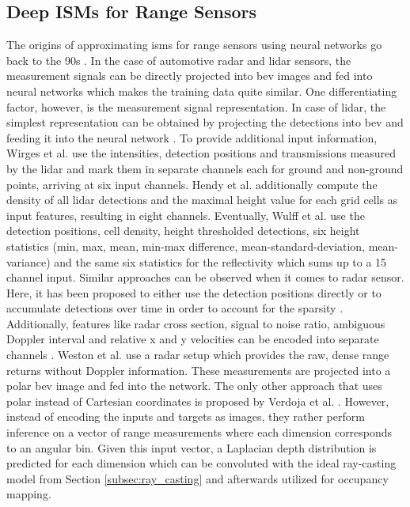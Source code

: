 \subsection{Deep ISMs for Range Sensors}
\label{subsec:deep_ism_range}
The origins of approximating \gls{ism}s for range sensors using neural networks go back to the 90s \cite{van1995neural,thrun1993exploration}. In the case of automotive radar and lidar sensors, the measurement signals can be directly projected into \gls{bev} images and fed into neural networks which makes the training data quite similar. One differentiating factor, however, is the measurement signal representation. In case of lidar, the simplest representation can be obtained by projecting the detections into \gls{bev} and feeding it into the neural network \cite{liang2018deep}. To provide additional input information, Wirges et al. \cite{wirges2018evidential} use the intensities, detection positions and transmissions measured by the lidar and mark them in separate channels each for ground and non-ground points, arriving at six input channels. Hendy et al. \cite{hendy2020fishing} additionally compute the density of all lidar detections and the maximal height value for each grid cells as input features, resulting in eight channels. Eventually, Wulff et al. \cite{wulff2018early} use the detection positions, cell density, height thresholded detections, six height statistics (min, max, mean, min-max difference, mean-standard-deviation, mean-variance) and the same six statistics for the reflectivity which sums up to a 15 channel input. Similar approaches can be observed when it comes to radar sensor. Here, it has been proposed to either use the detection positions directly \cite{sless2019road} or to accumulate detections over time in order to account for the sparsity \cite{prophet2019semantic,lombacher2017semantic}. Additionally, features like radar cross section, signal to noise ratio, ambiguous Doppler interval and relative x and y velocities can be encoded into separate channels \cite{hendy2020fishing}. Weston et al. \cite{weston2019probably} use a radar setup which provides the raw, dense range returns without Doppler information. These measurements are projected into a polar \gls{bev} image and fed into the network. The only other approach that uses polar instead of Cartesian coordinates is proposed by Verdoja et al. \cite{verdoja2019deep}. However, instead of encoding the inputs and targets as images, they rather perform inference on a vector of range measurements where each dimension corresponds to an angular bin. Given this input vector, a Laplacian depth distribution is predicted for each dimension which can be convoluted with the ideal ray-casting model from Section \ref{subsec:ray_casting} and afterwards utilized for occupancy mapping.
%
